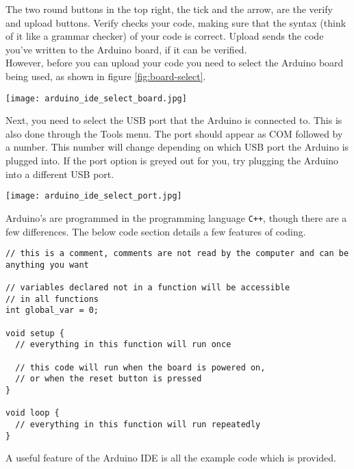 \documentclass[../TinyBot.tex]{subfiles}
\begin{document}
The two round buttons in the top right, the tick and the arrow, are the verify and upload buttons.
Verify checks your code, making sure that the syntax (think of it like a grammar checker) of
your code is correct. Upload sends the code you've written to the Arduino board, if it can be verified.  \\

However, before you can upload your code you need to select the Arduino board being used, as shown in figure
\ref{fig:board-select}.

\begin{center}
  \texttt{[image: arduino\_ide\_select\_board.jpg]}
  \label{fig:board-select}
\end{center}

Next, you need to select the USB port that the Arduino is connected to. This is also done
through the Tools menu. The port should appear as COM followed by a number. This number
will change depending on which USB port the Arduino is plugged into. If the port option is
greyed out for you, try plugging the Arduino into a different USB port. 

\begin{center}
  \texttt{[image: arduino\_ide\_select\_port.jpg]}
\end{center}

\bigskip
\newpage

Arduino's are programmed in the programming language \lstinline[]!C++!, though there
are a few differences. The below code section details a few features of coding.

\begin{lstlisting}
// this is a comment, comments are not read by the computer and can be anything you want

// variables declared not in a function will be accessible
// in all functions
int global_var = 0;

void setup {
  // everything in this function will run once

  // this code will run when the board is powered on,
  // or when the reset button is pressed
}

void loop {
  // everything in this function will run repeatedly
}

\end{lstlisting}
\bigskip

\pagebreak
A useful feature of the Arduino IDE is all the example code which is provided.
\end{document}
